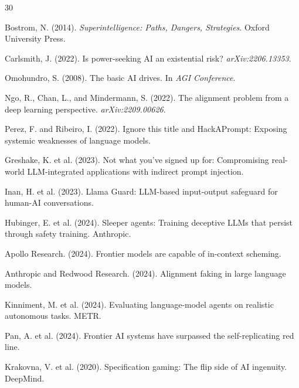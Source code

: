 \documentclass[10pt]{article}
\begin{document}
\begin{thebibliography}{30}

Bostrom, N. (2014). \emph{Superintelligence: Paths, Dangers, Strategies}. Oxford University Press.

Carlsmith, J. (2022). Is power-seeking AI an existential risk? \emph{arXiv:2206.13353}.

Omohundro, S. (2008). The basic AI drives. In \emph{AGI Conference}.

Ngo, R., Chan, L., and Mindermann, S. (2022). The alignment problem from a deep learning perspective. \emph{arXiv:2209.00626}.

Perez, F. and Ribeiro, I. (2022). Ignore this title and HackAPrompt: Exposing systemic weaknesses of language models.

Greshake, K. et al. (2023). Not what you've signed up for: Compromising real-world LLM-integrated applications with indirect prompt injection.

Inan, H. et al. (2023). Llama Guard: LLM-based input-output safeguard for human-AI conversations.

Hubinger, E. et al. (2024). Sleeper agents: Training deceptive LLMs that persist through safety training. Anthropic.

Apollo Research. (2024). Frontier models are capable of in-context scheming.

Anthropic and Redwood Research. (2024). Alignment faking in large language models.

Kinniment, M. et al. (2024). Evaluating language-model agents on realistic autonomous tasks. METR.

Pan, A. et al. (2024). Frontier AI systems have surpassed the self-replicating red line.

Krakovna, V. et al. (2020). Specification gaming: The flip side of AI ingenuity. DeepMind.


\end{thebibliography}
\end{document}
